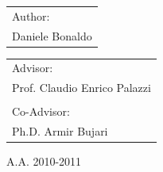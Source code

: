 \begin{titlepage}
    \begin{tabular}{l}
        Author:\\
        Daniele Bonaldo\\
    \end{tabular}
    \hfill
    \begin{tabular}{l}
        Advisor:\\
        Prof. Claudio Enrico Palazzi\\
        \\                                      %
        Co-Advisor:\\
        Ph.D. Armir Bujari 
    \end{tabular}
    \vfill
    \vspace{1cm}
        \begin{center}
            A.A. 2010-2011 \\
        \end{center}
\end{titlepage}

\clearpage{\pagestyle{empty}\cleardoublepage}
